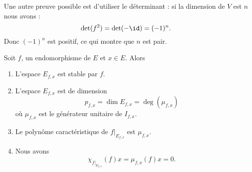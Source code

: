 Une autre preuve possible est d'utiliser le déterminant : si la dimension de \( V\) est \( n\) nous avons :
\begin{equation}
    \det(f^2)=\det(-\id)=(-1)^n.
\end{equation}
Donc \( (-1)^n\) est positif, ce qui montre que \( n\) est pair.

\begin{proposition}\label{PropNrZGhT}
    Soit \( f\), un endomorphisme de \( E\) et \( x\in E\). Alors
    \begin{enumerate}
        \item
            L'espace \( E_{f,x}\) est stable par \( f\).
        \item\label{ItemfzKOCo}
            L'espace \( E_{f,x}\) est de dimension
            \begin{equation}
                p_{f,x}=\dim E_{f,x}=\deg(\mu_{f,x})
            \end{equation}
            où \( \mu_{f,x}\) est le générateur unitaire de \( I_{f,x}\).
        \item   \label{ItemKHNExH}
            Le polynôme caractéristique de \( f|_{E_{f,x}}\) est \( \mu_{f,x}\).
        \item   \label{ItemHMviZw}
            Nous avons
            \begin{equation}
                \chi_{f|_{E_{f,x}}}(f)x=\mu_{f,x}(f)x=0.
            \end{equation}
    \end{enumerate}
\end{proposition}

